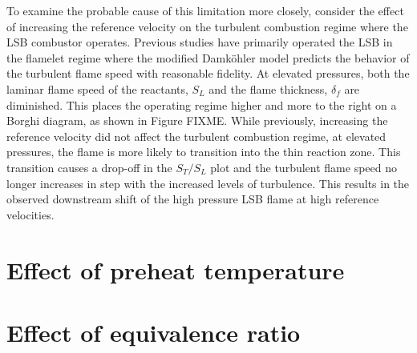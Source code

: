 To examine the probable cause of this limitation more closely, consider the effect of increasing the reference velocity on the turbulent combustion regime where the LSB combustor operates.
Previous studies have primarily operated the LSB in the flamelet regime where the modified Damk\"ohler model predicts the behavior of the turbulent flame speed with reasonable fidelity.
At elevated pressures, both the laminar flame speed of the reactants, \(S_L\) and the flame thickness, \(\delta_f\) are diminished.
This places the operating regime higher and more to the right on a Borghi diagram, as shown in Figure FIXME.
While previously, increasing the reference velocity did not affect the turbulent combustion regime, at elevated pressures, the flame is more likely to transition into the thin reaction zone.
This transition causes a drop-off in the \(S_T/S_L\) plot and the turbulent flame speed no longer increases in step with the increased levels of turbulence.
This results in the observed downstream shift of the high pressure LSB flame at high reference velocities.

\section{Effect of preheat temperature}



\section{Effect of equivalence ratio}

